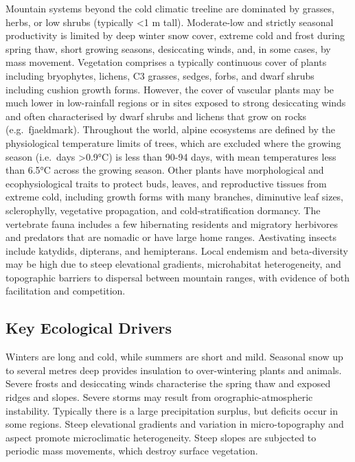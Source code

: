 \documentclass[
  letterpaper,
  DIV=11,
  numbers=noendperiod]{scrartcl}
\begin{document}
Mountain systems beyond the cold climatic treeline are dominated by
grasses, herbs, or low shrubs (typically \textless1 m tall).
Moderate-low and strictly seasonal productivity is limited by deep
winter snow cover, extreme cold and frost during spring thaw, short
growing seasons, desiccating winds, and, in some cases, by mass
movement. Vegetation comprises a typically continuous cover of plants
including bryophytes, lichens, C3 grasses, sedges, forbs, and dwarf
shrubs including cushion growth forms. However, the cover of vascular
plants may be much lower in low-rainfall regions or in sites exposed to
strong desiccating winds and often characterised by dwarf shrubs and
lichens that grow on rocks (e.g.~fjaeldmark). Throughout the world,
alpine ecosystems are defined by the physiological temperature limits of
trees, which are excluded where the growing season (i.e.~days
\textgreater0.9°C) is less than 90-94 days, with mean temperatures less
than 6.5°C across the growing season. Other plants have morphological
and ecophysiological traits to protect buds, leaves, and reproductive
tissues from extreme cold, including growth forms with many branches,
diminutive leaf sizes, sclerophylly, vegetative propagation, and
cold-stratification dormancy. The vertebrate fauna includes a few
hibernating residents and migratory herbivores and predators that are
nomadic or have large home ranges. Aestivating insects include katydids,
dipterans, and hemipterans. Local endemism and beta-diversity may be
high due to steep elevational gradients, microhabitat heterogeneity, and
topographic barriers to dispersal between mountain ranges, with evidence
of both facilitation and competition.

\subsection{Key Ecological Drivers}\label{key-ecological-drivers-96}

Winters are long and cold, while summers are short and mild. Seasonal
snow up to several metres deep provides insulation to over-wintering
plants and animals. Severe frosts and desiccating winds characterise the
spring thaw and exposed ridges and slopes. Severe storms may result from
orographic-atmospheric instability. Typically there is a large
precipitation surplus, but deficits occur in some regions. Steep
elevational gradients and variation in micro-topography and aspect
promote microclimatic heterogeneity. Steep slopes are subjected to
periodic mass movements, which destroy surface vegetation.
\end{document}

